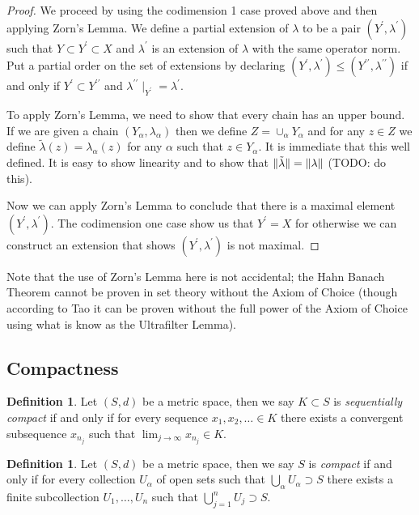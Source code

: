 \documentclass{amsart}
\theoremstyle{remark}
\theoremstyle{definition}
\newtheorem{defn}[thm]{Definition}
\begin{document}
\begin{proof}We proceed by using the codimension 1 case proved above
  and then applying Zorn's Lemma.  We define a partial extension of
  $\lambda$ to be a pair $(Y^\prime, \lambda^\prime)$ such that $Y
  \subset Y^\prime \subset X$ and $\lambda^\prime$ is an extension of
  $\lambda$ with the same operator norm.  Put a partial order on the
  set of extensions by declaring $(Y^\prime, \lambda^\prime) \leq
  (Y^{\prime\prime}, \lambda^{\prime\prime})$ if and only if $Y^\prime
  \subset Y^{\prime\prime}$ and $\lambda^{\prime\prime}\mid_{Y^\prime}
  = \lambda^\prime$.

To apply Zorn's Lemma, we need to show that every chain has an upper
bound.  If we are given a chain $(Y_\alpha, \lambda_\alpha)$ then we
define $Z = \cup_\alpha Y_\alpha$ and for any $z \in Z$ we define
$\tilde{\lambda}(z) = \lambda_\alpha(z)$ for any $\alpha$ such that $z \in
Y_\alpha$.  It is immediate that this well defined.  It is easy to
show linearity and to show that $\lVert \tilde{\lambda} \rVert =
\lVert \lambda \rVert$ (TODO: do this).

Now we can apply Zorn's Lemma to conclude that there is a maximal
element $(Y^\prime, \lambda^\prime)$.  The codimension one case show
us that $Y^\prime = X$ for otherwise we can construct an extension
that shows $(Y^\prime, \lambda^\prime)$ is not maximal.
\end{proof}
Note that the use of Zorn's Lemma here is not accidental; the Hahn
Banach Theorem cannot be proven in set theory without the Axiom of
Choice (though according to Tao it can be proven without the full
power of the Axiom of Choice using what is know as the Ultrafilter Lemma).
\subsection{Compactness}

\begin{defn}Let $(S,d)$ be a metric space, then we say $K \subset S$
  is \emph{sequentially compact} if and only if for every sequence $x_1, x_2,
  \dots \in K$ there exists a convergent subsequence $x_{n_j}$ such
  that $\lim_{j \to \infty} x_{n_j} \in K$.
\end{defn}

\begin{defn}Let $(S,d)$ be a metric space, then we say $S$
  is \emph{compact} if and only if for every collection $U_\alpha$ of
  open sets such that $\bigcup_\alpha U_\alpha \supset S$ there
  exists a finite subcollection $U_1, \dots, U_n$ such that
  $\bigcup_{j=1}^n U_j \supset S$.
\end{defn}
\end{document}
